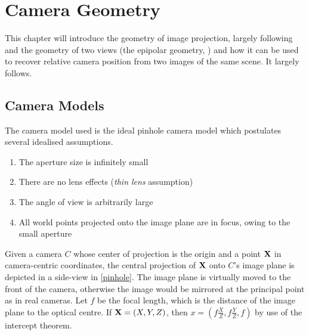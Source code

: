 \chapter{Camera Geometry}

This chapter will introduce the geometry of image projection, largely following
\citep[chapters 6,7]{h&z2004} and the geometry of two views (the epipolar
geometry, \citet[chapter 5.1]{ma2003}) and
how it can be used to recover relative camera position from two images of the
same scene. It largely follows.

\section{Camera Models}

The camera model used is the ideal pinhole camera model which postulates several
idealised assumptions.
\begin{enumerate}
   \item The aperture size is infinitely small
   \item There are no lens effects (\emph{thin lens} assumption)
   \item The angle of view is arbitrarily large
   \item All world points projected onto the image plane are in focus, owing to
      the small aperture
\end{enumerate}


Given a camera $C$ whose center of projection is the origin and a point
$\mathbf{X}$ in camera-centric coordinates, the central projection of
$\mathbf{X}$ onto $C$'s image plane is depicted in a side-view in
\autoref{pinhole}.  The image plane is virtually moved to the front of the
camera, otherwise the image would be mirrored at the principal point as in real
cameras.  Let $f$ be the focal length, which is the distance of the image plane
to the optical centre.  If $\mathbf{X} = (X,Y,Z)$, then $x=\left(f \frac{X}{Z},
f \frac{Y}{Z}, f\right)$ by use of the intercept theorem.%


